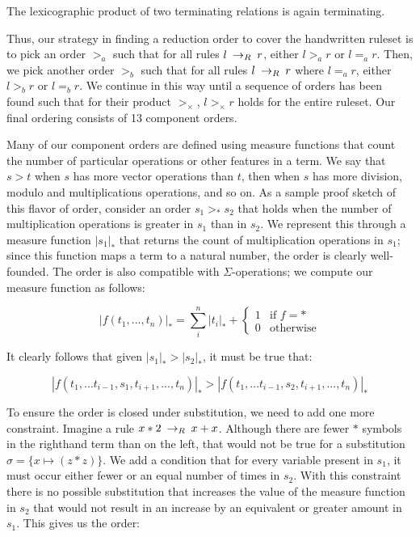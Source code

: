 \begin{theorem}
The lexicographic product of two terminating relations is again terminating.
\end{theorem}

Thus, our strategy in finding a reduction order to cover the handwritten ruleset is to pick an order $>_a$ such that for all rules $l \:\rightarrow_{R}\: r$, either $l >_a r$ or $l =_a r$. Then, we pick another order $>_b$ such that for all rules $l \:\rightarrow_{R}\: r$ where $l =_a r$, either $l >_b r$ or $l =_b r$. We continue in this way until a sequence of orders has been found such that for their product $>_{\times}$, $l >_{\times} r$ holds for the entire ruleset.  Our final ordering consists of 13 component orders.

Many of our component orders are defined using measure functions that count the number of particular operations or other features in a term. We say that $s > t$ when $s$ has more vector operations than $t$, then when $s$ has more division, modulo and multiplications operations, and so on. As a sample proof sketch of this flavor of order, consider an order $s_1 >_* s_2$ that holds when the number of multiplication operations is greater in $s_1$ than in $s_2$. We represent this through a measure function $|s_1|_*$ that returns the count of multiplication operations in $s_1$; since this function maps a term to a natural number, the order is clearly well-founded. The order is also compatible with $\Sigma$-operations; we compute our measure function as follows:


\[
|f(t_1,...,t_n)|_* = \sum_i^n |t_i|_* + \begin{cases} 1 & \textrm{if } f = * \\
                                                      0 & \textrm{otherwise}
                                        \end{cases}
\]

It clearly follows that given $|s_1|_* > |s_2|_*$, it must be true that:

\[
|f(t_1,...t_{i-1},s_1,t_{i+1},...,t_n)|_* > |f(t_1,...t_{i-1},s_2,t_{i+1},...,t_n)|_*
\]

To ensure the order is closed under substitution, we need to add one more constraint. Imagine a rule $x * 2 \:\rightarrow_{R}\: x + x$. Although there are fewer $*$ symbols in the righthand term than on the left, that would not be true for a substitution $\sigma = \{x \mapsto (z * z)\}$. We add a condition that for every variable present in $s_1$, it must occur either fewer or an equal number of times in $s_2$. With this constraint there is no possible substitution that increases the value of the measure function in $s_2$ that would not result in an increase by an equivalent or greater amount in $s_1$. This gives us the order:

